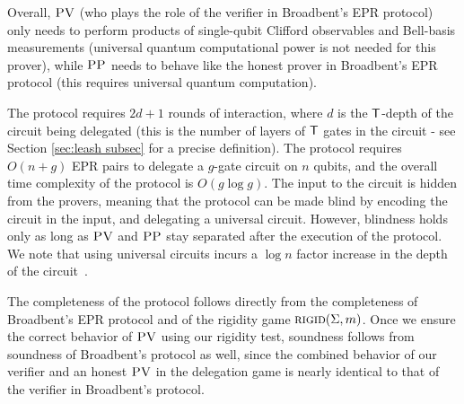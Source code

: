Overall, $\textsc{PV}$ (who plays the role of the verifier in Broadbent's EPR protocol) only needs to perform
products of single-qubit Clifford observables and Bell-basis measurements (universal quantum
computational power is not needed for this prover), while $\textsc{PP}$ needs to behave like the honest prover in Broadbent's EPR protocol (this requires universal quantum computation).

The protocol requires $2d+1$ rounds of interaction, where $d$ is the $\sf T$-depth of the circuit being delegated (this is the number of layers of $\sf T$ gates in the circuit - see Section \ref{sec:leash subsec} for a precise definition). %
The protocol requires $O(n+g)$ EPR pairs to delegate a $g$-gate circuit on $n$ qubits, and the overall time complexity of the protocol is $O(g\log g)$.
The input to the circuit is hidden from the provers, meaning that the protocol can be made blind by encoding the circuit in the input, and delegating a universal circuit. However, blindness holds only as long as $\textsc{PV}$ and $\textsc{PP}$ stay separated after the execution of the protocol. We note that using universal circuits incurs a $\log{n}$ factor increase in the depth of the circuit~\cite{BeraFGH10}.

The completeness of the protocol follows directly from the completeness of Broadbent's EPR protocol and of the rigidity game $\textsc{rigid}(\Sigma,m)$. Once we ensure the correct behavior of $\textsc{PV}$ using our rigidity test, soundness follows from soundness of Broadbent's protocol as well, since the combined behavior of our verifier and an honest $\textsc{PV}$ in the delegation game is nearly identical to that of the verifier in Broadbent's protocol.

